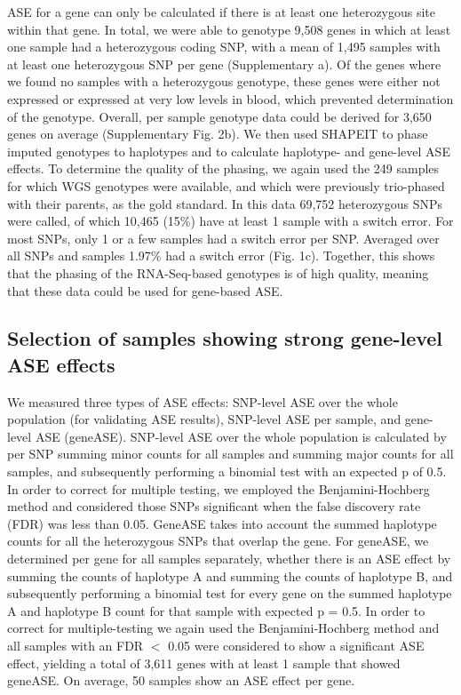 ASE for a gene can only be calculated if there is at least one heterozygous site within that gene. In total, we were able to genotype 9,508 genes in which at least one sample had a heterozygous coding SNP, with a mean of 1,495 samples with at least one heterozygous SNP per gene (Supplementary a). Of the genes where we found no samples with a heterozygous genotype, these genes were either not expressed or expressed at very low levels in blood, which prevented determination of the genotype. Overall, per sample genotype data could be derived for 3,650 genes on average (Supplementary Fig. 2b). We then used SHAPEIT\cite{oconnellGeneralApproachHaplotype2014} to phase imputed genotypes to haplotypes and to calculate haplotype- and gene-level ASE effects. To determine the quality of the phasing, we again used the 249 samples for which WGS genotypes were available, and which were previously trio-phased with their parents, as the gold standard. In this data 69,752 heterozygous SNPs were called, of which 10,465 (15\%) have at least 1 sample with a switch error. For most SNPs, only 1 or a few samples had a switch error per SNP. Averaged over all SNPs and samples 1.97\% had a switch error (Fig. 1c). Together, this shows that the phasing of the RNA-Seq-based genotypes is of high quality, meaning that these data could be used for gene-based ASE.

\subsection{Selection of samples showing strong gene-level ASE effects}
We measured three types of ASE effects: SNP-level ASE over the whole population (for validating ASE results), SNP-level ASE per sample, and gene-level ASE (geneASE). SNP-level ASE over the whole population is calculated by per SNP summing minor counts for all samples and summing major counts for all samples, and subsequently performing a binomial test with an expected p of 0.5. In order to correct for multiple testing, we employed the Benjamini-Hochberg method and considered those SNPs significant when the false discovery rate (FDR) was less than 0.05. GeneASE takes into account the summed haplotype counts for all the heterozygous SNPs that overlap the gene. For geneASE, we determined per gene for all samples separately, whether there is an ASE effect by summing the counts of haplotype A and summing the counts of haplotype B, and subsequently performing a binomial test for every gene on the summed haplotype A and haplotype B count for that sample with expected p = 0.5. In order to correct for multiple-testing we again used the Benjamini-Hochberg method and all samples with an FDR $<$ 0.05 were considered to show a significant ASE effect, yielding a total of 3,611 genes with at least 1 sample that showed geneASE. On average, 50 samples show an ASE effect per gene.

